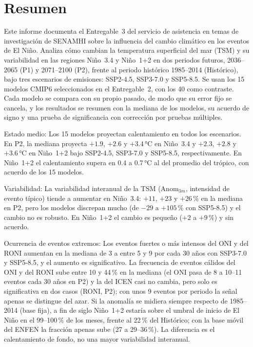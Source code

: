 \documentclass[11pt,a4paper]{article}
\begin{document}
\section{Resumen}

Este informe documenta el Entregable~3 del servicio de asistencia en temas de investigación de SENAMHI sobre la influencia del cambio climático en los eventos de El Niño. Analiza cómo cambian la temperatura superficial del mar (TSM) y su variabilidad en las regiones Niño~3.4 y Niño~1+2 en dos periodos futuros, 2036--2065 (P1) y 2071--2100 (P2), frente al periodo histórico 1985--2014 (Histórico), bajo tres escenarios de emisiones: SSP2-4.5, SSP3-7.0 y SSP5-8.5. Se usan los 15 modelos CMIP6 seleccionados en el Entregable~2, con los 40 como contraste. Cada modelo se compara con su propio pasado, de modo que su error fijo se cancela, y los resultados se resumen con la mediana de los modelos, su acuerdo de signo y una prueba de significancia con corrección por pruebas múltiples.

Estado medio: 
Los 15 modelos proyectan calentamiento en todos los escenarios. 
En P2, la mediana proyecta $+1.9$, $+2.6$ y $+3.4$\,°C en Niño~3.4 y $+2.3$, $+2.8$ y $+3.6$\,°C en Niño~1+2 bajo SSP2-4.5, SSP3-7.0 y SSP5-8.5, respectivamente. 
En Niño~1+2 el calentamiento supera en 0.4 a 0.7\,°C al del promedio del trópico, con acuerdo de los 15 modelos.

Variabilidad: 
La variabilidad interanual de la TSM ($\mathrm{Anom}_{3m}$, intensidad de evento típico) tiende a aumentar en Niño~3.4: $+11$, $+23$ y $+26$\,\% en la mediana en P2, pero los modelos discrepan mucho (de $-29$ a $+105$\,\% con SSP5-8.5) y el cambio no es robusto. 
En Niño~1+2 el cambio es pequeño ($+2$ a $+9$\,\%) y sin acuerdo.

Ocurrencia de eventos extremos: 
Los eventos fuertes o más intensos del ONI y del RONI aumentan en la mediana de 3 a entre 5 y 9 por cada 30 años con SSP3-7.0 y SSP5-8.5, y el aumento es significativo. 
La frecuencia de eventos cálidos del ONI y del RONI sube entre 10 y 44\,\% en la mediana (el ONI pasa de 8 a 10--11 eventos cada 30 años en P2) y la del ICEN casi no cambia, pero solo es significativa en dos casos (RONI, P2); con unos 9 eventos por periodo la señal apenas se distingue del azar. 
Si la anomalía se midiera siempre respecto de 1985--2014 (base fija), a fin de siglo Niño~1+2 estaría sobre el umbral de inicio de El Niño en el 99--100\,\% de los meses, frente al 22\,\% del Histórico; con la base móvil del ENFEN la fracción apenas sube (27 a 29--36\,\%). La diferencia es el calentamiento de fondo, no una mayor variabilidad interanual.
\end{document}
